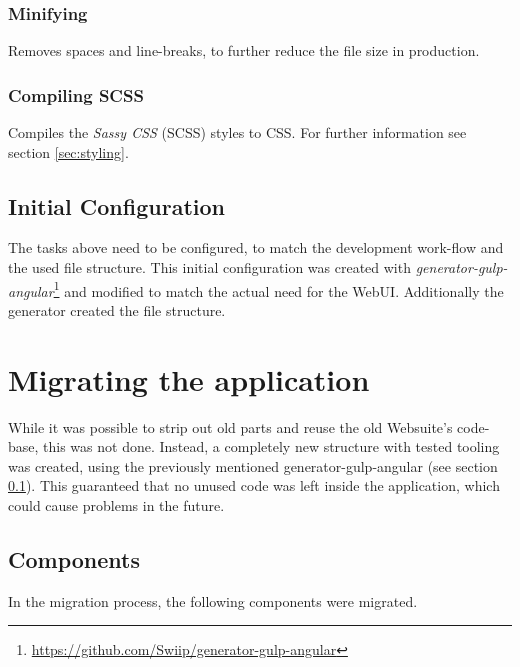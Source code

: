 \subsubsection{Minifying} Removes spaces and line-breaks, to further reduce the file size in production.

\subsubsection{Compiling SCSS}
Compiles the \textit{Sassy CSS} (SCSS) styles to CSS. For further information see section \ref{sec:styling}.


\subsection{Initial Configuration}
\label{sec:initial_config}
The tasks above need to be configured, to match the development work-flow and the used file structure. This initial configuration was created with \textit{generator-gulp-angular}\footnote{\url{https://github.com/Swiip/generator-gulp-angular}} and modified to match the actual need for the WebUI. Additionally the generator created the file structure.



\section{Migrating the application}
While it was possible to strip out old parts and reuse the old Websuite's code-base, this was not done. Instead, a completely new structure with tested tooling was created, using the previously mentioned generator-gulp-angular (see section \ref{sec:initial_config}). This guaranteed that no unused code was left inside the application, which could cause problems in the future.


\subsection{Components}
In the migration process, the following components were migrated.

